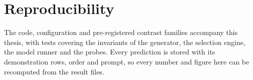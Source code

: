 \section{Reproducibility}
\label{app:repro}

The code, configuration and pre-registered contrast families accompany this thesis, with tests covering the invariants of the generator, the selection engine, the model runner and the probes.
Every prediction is stored with its demonstration rows, order and prompt, so every number and figure here can be recomputed from the result files.